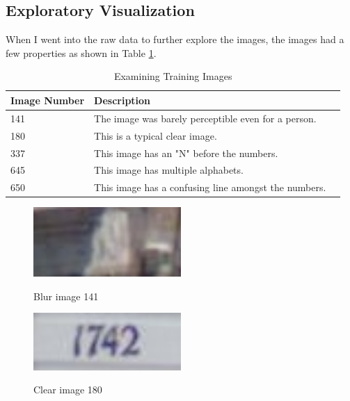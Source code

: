 \documentclass[twoside, column]{article}
\begin{document}
\subsection{Exploratory Visualization}

When I went into the raw data to further explore the images, the images had a few properties as shown in Table \ref{trainingimages}. 

\begin{table}[htp]
\caption{Examining Training Images}
\begin{center}
\begin{tabular}{llr}

\cmidrule(r){1-2}
Image Number & Description \\
\midrule
141 & The image was barely perceptible even for a person.\\
180 & This is a typical clear image. \\
337 & This image has an "N" before the numbers. \\
645 & This image has multiple alphabets. \\
650 & This image has a confusing line amongst the numbers. \\

\end{tabular}
\end{center}
\label{trainingimages}
\end{table}

\begin{figure}
\caption{Blur image 141}
\centering
\includegraphics[width=0.5\textwidth]{141_blur}
\label{image141}
\end{figure}

\begin{figure}
\caption{Clear image 180}
\centering
\includegraphics[width=0.5\textwidth]{180_clear}
\label{image180}
\end{figure}
\end{document}
